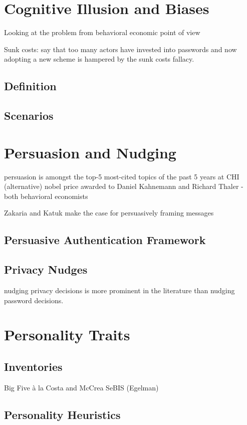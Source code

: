 \section{Cognitive Illusion and Biases}
Looking at the problem from behavioral economic point of view

Sunk costs: \cite{Herley2012PersistenceOfPasswords} say that too many actors have invested into passwords and now adopting a new scheme is hampered by the sunk costs fallacy.
	\subsection{Definition}
	\subsection{Scenarios}
	
\section{Persuasion and Nudging}

persuasion is amongst the top-5 most-cited topics of the past 5 years at CHI
(alternative) nobel price awarded to Daniel Kahnemann and Richard Thaler - both behavioral economists

\cite{Zakaria2013DesigningEffectiveSecurityMessages} Zakaria and Katuk make the case for persuasively framing messages

	\subsection{Persuasive Authentication Framework}
	\subsection{Privacy Nudges}
	nudging privacy decisions is more prominent in the literature than nudging password decisions. 

\section{Personality Traits}
	\subsection{Inventories}
	Big Five à la Costa and McCrea \cite{Costa1992NEO}
	SeBIS (Egelman)
	\subsection{Personality Heuristics}	
